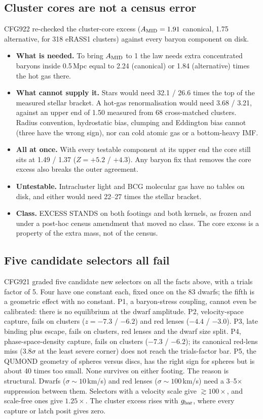 \documentclass[10pt]{article}
\begin{document}
\subsection{Cluster cores are not a census error}
CFG922 re-checked the cluster-core excess ($A_{\rm MID}=1.91$ canonical, 1.75 alternative, for 318 eRASS1 clusters) against every baryon component on disk.
\begin{itemize}
\item \textbf{What is needed.} To bring $A_{\rm MID}$ to 1 the law needs extra concentrated baryons inside 0.5\,Mpc equal to 2.24 (canonical) or 1.84 (alternative) times the hot gas there.
\item \textbf{What cannot supply it.} Stars would need 32.1 / 26.6 times the top of the measured stellar bracket. A hot-gas renormalisation would need 3.68 / 3.21, against an upper end of 1.50 measured from 68 cross-matched clusters. Radius convention, hydrostatic bias, clumping and Eddington bias cannot (three have the wrong sign), nor can cold atomic gas or a bottom-heavy IMF.
\item \textbf{All at once.} With every testable component at its upper end the core still sits at 1.49 / 1.37 ($Z=+5.2$ / $+4.3$). Any baryon fix that removes the core excess also breaks the outer agreement.
\item \textbf{Untestable.} Intracluster light and BCG molecular gas have no tables on disk, and either would need 22--27 times the stellar bracket.
\item \textbf{Class.} EXCESS STANDS on both footings and both kernels, as frozen and under a post-hoc census amendment that moved no class. The core excess is a property of the extra mass, not of the census.
\end{itemize}

\subsection{Five candidate selectors all fail}
CFG921 graded five candidate new selectors on all the facts above, with a trials factor of 5. Four have one constant each, fixed once on the 83 dwarfs; the fifth is a geometric effect with no constant.
P1, a baryon-stress coupling, cannot even be calibrated: there is no equilibrium at the dwarf amplitude. P2, velocity-space capture, fails on clusters ($z=-7.3$ / $-6.2$) and red lenses ($-4.4$ / $-3.0$). P3, late binding plus escape, fails on clusters, red lenses and the dwarf size split. P4, phase-space-density capture, fails on clusters ($-7.3$ / $-6.2$); its canonical red-lens miss (3.8$\sigma$ at the least severe corner) does not reach the trials-factor bar. P5, the QUMOND geometry of spheres versus discs, has the right sign for spheres but is about 40 times too small. None survives on either footing. The reason is structural. Dwarfs ($\sigma\sim10$\,km/s) and red lenses ($\sigma\sim100$\,km/s) need a 3--5$\times$ suppression between them. Selectors with a velocity scale give $\gtrsim100\times$, and scale-free ones give $1.25\times$. The cluster excess rises with $g_{\rm bar}$, where every capture or latch posit gives zero.
\end{document}
